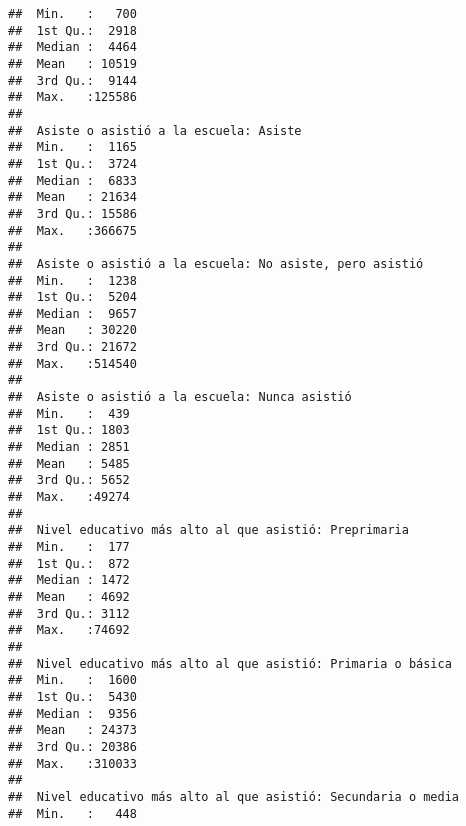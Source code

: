 \documentclass[11pt,]{article}
\begin{document}
\begin{verbatim}
##  Min.   :   700                                
##  1st Qu.:  2918                                
##  Median :  4464                                
##  Mean   : 10519                                
##  3rd Qu.:  9144                                
##  Max.   :125586                                
##                                                
##  Asiste o asistió a la escuela: Asiste
##  Min.   :  1165                       
##  1st Qu.:  3724                       
##  Median :  6833                       
##  Mean   : 21634                       
##  3rd Qu.: 15586                       
##  Max.   :366675                       
##                                       
##  Asiste o asistió a la escuela: No asiste, pero asistió
##  Min.   :  1238                                        
##  1st Qu.:  5204                                        
##  Median :  9657                                        
##  Mean   : 30220                                        
##  3rd Qu.: 21672                                        
##  Max.   :514540                                        
##                                                        
##  Asiste o asistió a la escuela: Nunca asistió
##  Min.   :  439                               
##  1st Qu.: 1803                               
##  Median : 2851                               
##  Mean   : 5485                               
##  3rd Qu.: 5652                               
##  Max.   :49274                               
##                                              
##  Nivel educativo más alto al que asistió: Preprimaria
##  Min.   :  177                                       
##  1st Qu.:  872                                       
##  Median : 1472                                       
##  Mean   : 4692                                       
##  3rd Qu.: 3112                                       
##  Max.   :74692                                       
##                                                      
##  Nivel educativo más alto al que asistió: Primaria o básica
##  Min.   :  1600                                            
##  1st Qu.:  5430                                            
##  Median :  9356                                            
##  Mean   : 24373                                            
##  3rd Qu.: 20386                                            
##  Max.   :310033                                            
##                                                            
##  Nivel educativo más alto al que asistió: Secundaria o media
##  Min.   :   448                                             

\end{verbatim}
\end{document}

